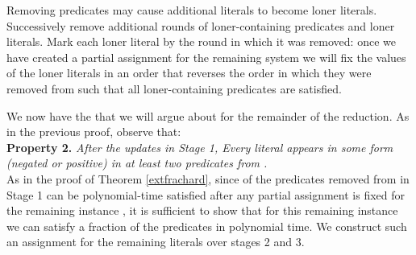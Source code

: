 \documentclass{article}
\begin{document}
Removing predicates may cause additional literals to become loner literals. Successively remove additional rounds of loner-containing predicates and loner literals. Mark each loner literal by the round in which it was removed: once we have created a partial assignment for the remaining system we will fix the values of the loner literals in an order that reverses the order in which they were removed from  such that all loner-containing predicates are satisfied. 

We now have the  that we will argue about for the remainder of the reduction. As in the previous proof, observe that: \\

\noindent \textbf{Property 2.} \textit{After the updates in Stage 1, Every literal  appears in some form (negated or positive) in at least two predicates from .}\\

As in the proof of Theorem \ref{extfrachard}, since  of the predicates removed from  in Stage 1 can be polynomial-time satisfied after any partial assignment is fixed for the remaining instance , it is sufficient to show that for this remaining instance we can satisfy a  fraction of the predicates in polynomial time. We construct such an assignment for the remaining literals over stages 2 and 3.
\end{document}
